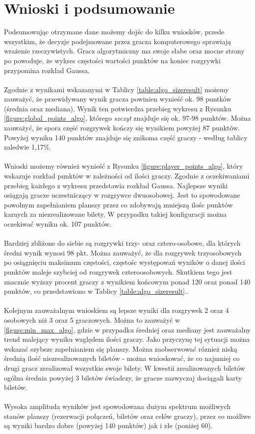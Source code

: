 \documentclass[12pt, oneside]{report}
\begin{document}
\section{Wnioski i podsumowanie} 
Podsumowując otrzymane dane możemy dojśc do kilku wniosków, przede wszystkim, że decyzje podejmowane przez gracza komputerowego sprawiają wrażenie rzeczywistych. Gracz algorytmiczny ma swoje słabe oraz mocne strony po powoduje, że wykres częstości wartości punktów na koniec rozgrywki przypomina rozkład Gaussa. \\ \\
Zgodnie z wynikami wskazanymi w Tablicy \ref{table:algo_sizeresult} możemy zauważyć, że przewidywany wynik gracza powinien wynieść ok. 98 puntków (średnia oraz mediana). Wynik ten potwierdza przebieg wykresu z Rysunku \ref{figure:global_points_algo}, którego \textit{szczyt} znajduje się ok. 97-98 punktów. Można zauważyć, że spora część rozgrywek kończy się wynikiem powyżej 87 punktów. Powyżej wyniku 140 punktów znajduje się znikoma część graczy - według tablicy zaledwie 1,17\%. \\ \\ 
Wnioski możemy również wynieść z Rysunku \ref{figure:player_points_algo}, który wskazuje rozkład punktów w zależności od ilości graczy. Zgodnie z oczekiwaniami przebieg każdego z wykresu przedstawia rozkład Gaussa. Najlepsze wyniki osiągają gracze uczestniczący w rozgrywce dwuosobowej. Jest to spowodowane powolnym zapełnianiem planszy przez co zdobywają mniejszą ilośc punktów karnych za niezrealizowane bilety. W przypadku takiej konfiguracji można oczekiwać wyniku ok. 107 punktów. \\ \\ 
Bardziej zbliżone do siebie są rozgrywki trzy- oraz cztero-osobowe, dla których średni wynik wynosi 98 pkt. Można zauważyć, że dla rozgrywek trzyosobowych po osiągnięciu maksimum częstości, częstośc występowań wyników o danej ilości punktów maleje szybciej od rozgrywek czteroosobowych. Skutkiem tego jest znacznie wyższy procent graczy z wynikiem końcowym ponad 120 oraz ponad 140 punktów, co przedstawiono w Tablicy \ref{table:algo_sizeresult}.. \\ \\
Kolejnym zauważalnym wnioskiem są lepsze wyniki dla rozgrywek 2 oraz 4 osobowych niż 3 oraz 5 graczowych. Można to zauważyć w \ref{figure:min_max_algo}, gdzie w przypadku średniej oraz mediany jest zauważalny trend malejący wyniku względem ilości graczy. Jako przyczynę tej sytuacji można wskazać szybsze zapełnianiem się planszy. Można zaobserwować róznież niską średnią ilość niezrealizowanych biletów - można wnioskować, że co najmniej co drugi gracz zrealizował wszystkie swoje bilety. W kwestii zrealizowanych biletów ogólna średnia powyżej 3 biletów świadczy, że gracze zazwyczaj dociągali karty biletów. \\ \\
Wysoka amplituda wyników jest spowodowana dużym spektrum możliwych stanów planszy (rezerwacji połączeń, biletów oraz celów graczy), przez co możliwe są wyniki bardzo dobre (powyżej 140 punktów) jak i złe (poniżej 60). 
\end{document}
